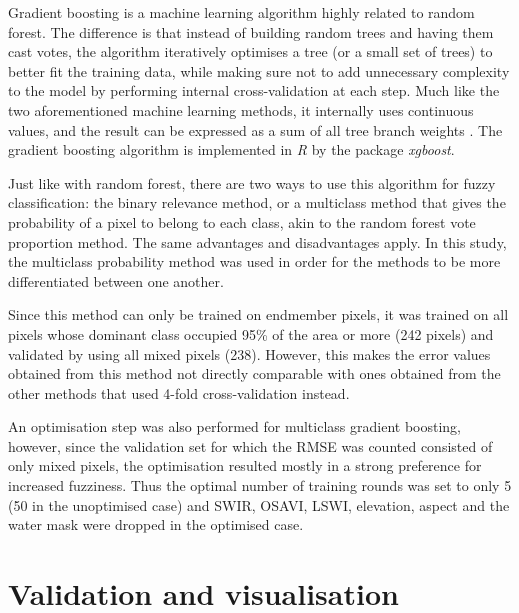 \documentclass[a4paper,12pt]{scrbook}
\begin{document}
Gradient boosting is a machine learning algorithm highly related to random forest. The difference is that instead of building random trees and having them cast votes, the algorithm iteratively optimises a tree (or a small set of trees) to better fit the training data, while making sure not to add unnecessary complexity to the model by performing internal cross-validation at each step. Much like the two aforementioned machine learning methods, it internally uses continuous values, and the result can be expressed as a sum of all tree branch weights \citep{friedman2001gradientboost}. The gradient boosting algorithm is implemented in \textit{R} by the package \textit{xgboost}.

Just like with random forest, there are two ways to use this algorithm for fuzzy classification: the binary relevance method, or a multiclass method that gives the probability of a pixel to belong to each class, akin to the random forest vote proportion method. The same advantages and disadvantages apply. In this study, the multiclass probability method was used in order for the methods to be more differentiated between one another.

Since this method can only be trained on endmember pixels, it was trained on all pixels whose dominant class occupied 95\% of the area or more (242 pixels) and validated by using all mixed pixels (238). However, this makes the error values obtained from this method not directly comparable with ones obtained from the other methods that used 4-fold cross-validation instead.

An optimisation step was also performed for multiclass gradient boosting, however, since the validation set for which the RMSE was counted consisted of only mixed pixels, the optimisation resulted mostly in a strong preference for increased fuzziness. Thus the optimal number of training rounds was set to only 5 (50 in the unoptimised case) and SWIR, OSAVI, LSWI, elevation, aspect and the water mask were dropped in the optimised case.

\section{Validation and visualisation}
\end{document}
